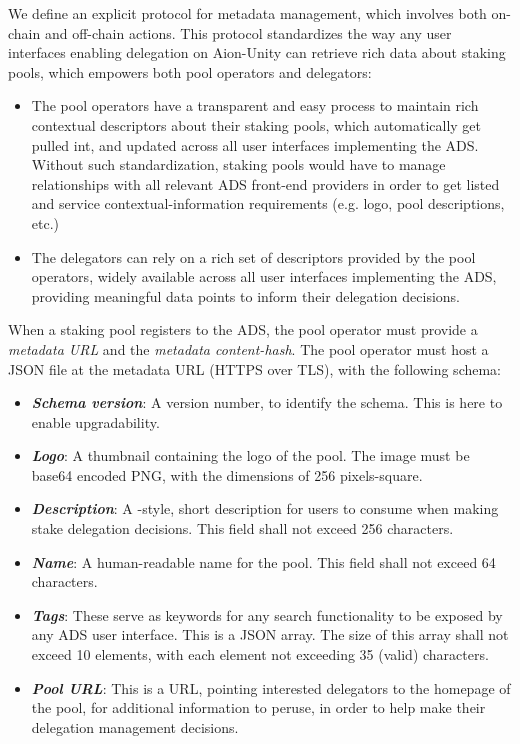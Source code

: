 We define an explicit protocol for metadata management, which involves both on-chain and off-chain actions. This protocol standardizes the way any user interfaces enabling delegation on Aion-Unity can retrieve rich data about staking pools, which empowers both pool operators and delegators: 
\begin{itemize}
    \item The pool operators have a transparent and easy process to maintain rich contextual descriptors about their staking pools, which automatically get pulled int, and updated across all user interfaces implementing the ADS. Without such standardization, staking pools would have to manage relationships with all relevant ADS front-end providers in order to get listed and service contextual-information requirements (e.g. logo, pool descriptions, etc.) 
    \item The delegators can rely on a rich set of descriptors provided by the pool operators, widely available across all user interfaces implementing the ADS, providing meaningful data points to inform their delegation decisions.   
\end{itemize}

When a staking pool registers to the ADS, the pool operator must provide a \textit{metadata URL} and the \textit{metadata content-hash}. The pool operator must host a JSON file at the metadata URL (HTTPS over TLS), with the following schema: 
\begin{itemize}[label=--,nosep]
    \item \textit{\textbf{Schema version}}: A version number, to identify the schema. This is here to enable upgradability. 
    \item \textit{\textbf{Logo}}: A thumbnail containing the logo of the pool. The image must be base64 encoded PNG, with the dimensions of 256 pixels-square.
    \item \textit{\textbf{Description}}: A -style, short description for users to consume when making stake delegation decisions. This field shall not exceed 256 characters.
    \item \textit{\textbf{Name}}: A human-readable name for the pool. This field shall not exceed 64 characters.
    \item \textit{\textbf{Tags}}: These serve as keywords for any search functionality to be exposed by any ADS user interface. This is a JSON array. The size of this array shall not exceed 10 elements, with each element not exceeding 35 (valid) characters.
    \item \textit{\textbf{Pool URL}}: This is a URL, pointing interested delegators to the homepage of the pool, for additional information to peruse, in order to help make their delegation management decisions. 
\end{itemize}

